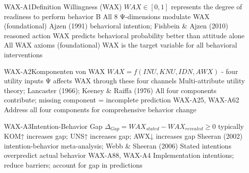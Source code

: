 \begin{axiomspec}{WAX-A1}{Definition Willingness (WAX)}
 $WAX \in [0,1]$ represents the degree of readiness to perform behavior B
 All 8 Ψ-dimensions modulate WAX (foundational)
 Ajzen (1991) behavioral intention; Fishbein \& Ajzen (2010) reasoned action
 WAX predicts behavioral probability better than attitude alone
 All WAX axioms (foundational)
 WAX is the target variable for all behavioral interventions
\end{axiomspec}


\begin{axiomspec}{WAX-A2}{Komponenten von WAX}
 $WAX = f(INU, KNU, IDN, AWX)$ - four utility inputs
 Ψ affects WAX through these four channels
 Multi-attribute utility theory; Lancaster (1966); Keeney \& Raiffa (1976)
 All four components contribute; missing component = incomplete prediction
 WAX-A25, WAX-A62
 Address all four components for comprehensive behavior change
\end{axiomspec}


\begin{axiomspec}{WAX-A3}{Intention-Behavior Gap}
 $\Delta_{Gap} = WAX_{stated} - WAX_{revealed} \geq 0$ typically
 KOM↑ increases gap; UNS↑ increases gap; AWX↓ increases gap
 Sheeran (2002) intention-behavior meta-analysis; Webb \& Sheeran (2006)
 Stated intentions overpredict actual behavior
 WAX-A88, WAX-A4
 Implementation intentions; reduce barriers; account for gap in predictions
\end{axiomspec}


